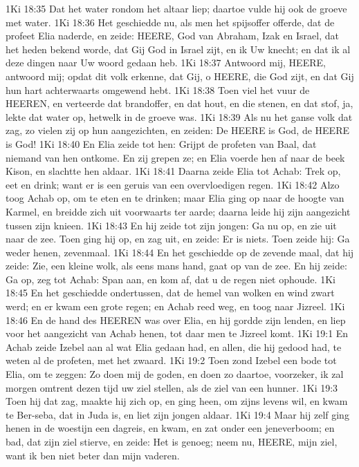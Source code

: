 1Ki 18:35  Dat het water rondom het altaar liep; daartoe vulde hij ook de groeve met water.
1Ki 18:36  Het geschiedde nu, als men het spijsoffer offerde, dat de profeet Elia naderde, en zeide: HEERE, God van Abraham, Izak en Israel, dat het heden bekend worde, dat Gij God in Israel zijt, en ik Uw knecht; en dat ik al deze dingen naar Uw woord gedaan heb.
1Ki 18:37  Antwoord mij, HEERE, antwoord mij; opdat dit volk erkenne, dat Gij, o HEERE, die God zijt, en dat Gij hun hart achterwaarts omgewend hebt.
1Ki 18:38  Toen viel het vuur de HEEREN, en verteerde dat brandoffer, en dat hout, en die stenen, en dat stof, ja, lekte dat water op, hetwelk in de groeve was.
1Ki 18:39  Als nu het ganse volk dat zag, zo vielen zij op hun aangezichten, en zeiden: De HEERE is God, de HEERE is God!
1Ki 18:40  En Elia zeide tot hen: Grijpt de profeten van Baal, dat niemand van hen ontkome. En zij grepen ze; en Elia voerde hen af naar de beek Kison, en slachtte hen aldaar.
1Ki 18:41  Daarna zeide Elia tot Achab: Trek op, eet en drink; want er is een geruis van een overvloedigen regen.
1Ki 18:42  Alzo toog Achab op, om te eten en te drinken; maar Elia ging op naar de hoogte van Karmel, en breidde zich uit voorwaarts ter aarde; daarna leide hij zijn aangezicht tussen zijn knieen.
1Ki 18:43  En hij zeide tot zijn jongen: Ga nu op, en zie uit naar de zee. Toen ging hij op, en zag uit, en zeide: Er is niets. Toen zeide hij: Ga weder henen, zevenmaal.
1Ki 18:44  En het geschiedde op de zevende maal, dat hij zeide: Zie, een kleine wolk, als eens mans hand, gaat op van de zee. En hij zeide: Ga op, zeg tot Achab: Span aan, en kom af, dat u de regen niet ophoude.
1Ki 18:45  En het geschiedde ondertussen, dat de hemel van wolken en wind zwart werd; en er kwam een grote regen; en Achab reed weg, en toog naar Jizreel.
1Ki 18:46  En de hand des HEEREN was over Elia, en hij gordde zijn lenden, en liep voor het aangezicht van Achab henen, tot daar men te Jizreel komt.
1Ki 19:1  En Achab zeide Izebel aan al wat Elia gedaan had, en allen, die hij gedood had, te weten al de profeten, met het zwaard.
1Ki 19:2  Toen zond Izebel een bode tot Elia, om te zeggen: Zo doen mij de goden, en doen zo daartoe, voorzeker, ik zal morgen omtrent dezen tijd uw ziel stellen, als de ziel van een hunner.
1Ki 19:3  Toen hij dat zag, maakte hij zich op, en ging heen, om zijns levens wil, en kwam te Ber-seba, dat in Juda is, en liet zijn jongen aldaar.
1Ki 19:4  Maar hij zelf ging henen in de woestijn een dagreis, en kwam, en zat onder een jeneverboom; en bad, dat zijn ziel stierve, en zeide: Het is genoeg; neem nu, HEERE, mijn ziel, want ik ben niet beter dan mijn vaderen.
